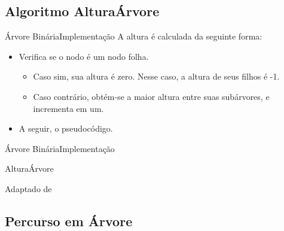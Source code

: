 \documentclass[aspectratio=169]{beamer}
\begin{document}

\subsection{Algoritmo AlturaÁrvore}

\begin{frame}{Árvore Binária}{Implementação}
A altura é calculada da seguinte forma:
 \begin{itemize}
 \item Verifica se o nodo é um nodo folha. 
 \begin{itemize}
 \item Caso sim, sua altura é zero. Nesse caso, a altura de seus filhos é -1.
 \item Caso contrário, obtém-se a maior altura entre suas subárvores, e incrementa em um.
 \end{itemize} 
 \item A seguir, o pseudocódigo.
 \end{itemize} 
\end{frame}

\begin{frame}{Árvore Binária}{Implementação}
\begin{algorithm}[H]
\caption{AlturaÁrvore} 
\label{AlturaArvore}
\end{algorithm}
\tiny{Adaptado de \cite{Backes2016}}
\end{frame}


\subsection{Percurso em Árvore}
\end{document}
